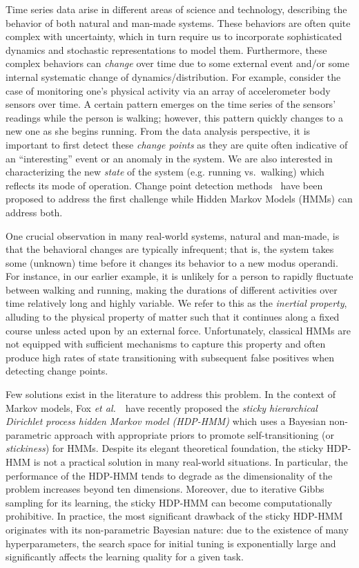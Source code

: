 \documentclass[letterpaper]{article}
\begin{document}
Time series data arise in different areas of science and technology, describing
the behavior of both natural and man-made systems. These
behaviors are often quite complex with uncertainty, which in turn require us to
incorporate sophisticated dynamics and stochastic representations to model them.
Furthermore, these complex behaviors can \emph{change} over time due to some external event and/or some internal
systematic change of dynamics/distribution. For example, consider the case of
monitoring one's physical activity via an array of accelerometer body sensors
over time. A certain pattern emerges on the time series of the sensors' readings
while the person is walking; however, this pattern quickly changes to a new one
as she begins running. From the data analysis perspective, it is
important to first detect these \emph{change points} as they are quite often
indicative of an ``interesting'' event or an anomaly in the system. We
are also interested in characterizing the new \emph{state} of the system (e.g. running vs.\
walking) which reflects its mode of operation. Change point detection
methods~\cite{kawahara2007change,xie2013change,liu2013change,ray2002bayesian}
have been proposed to address the first challenge while Hidden Markov Models (HMMs) can address both.

One crucial observation in many real-world systems, natural and man-made, is that the behavioral changes are typically infrequent; that is, the
system takes some (unknown) time before it changes its behavior to a new modus operandi. For
instance, in our earlier example, it is unlikely for a person to rapidly fluctuate between
walking and running, making the durations of different
activities over time relatively long and highly variable. We refer to this as the
\emph{inertial property}, alluding to the physical property of matter such that it continues
along a fixed course unless acted upon by an external
force. Unfortunately, classical HMMs are not equipped with sufficient
mechanisms to capture this property and often produce high rates of
state transitioning with subsequent false positives when detecting
change points.

Few solutions exist in the literature to address this problem. In
the context of Markov models, Fox \emph{et al.}~\cite{fox2011sticky,willsky2009nonparametric}\ have
recently proposed the \emph{sticky hierarchical Dirichlet process hidden Markov
model (HDP-HMM)} which uses a Bayesian non-parametric approach with appropriate
priors to promote self-transitioning (or \emph{stickiness}) for HMMs. Despite its
elegant theoretical foundation, the sticky HDP-HMM is not a practical solution in many real-world situations.
In particular, the performance of the HDP-HMM tends to degrade as the
dimensionality of the problem increases beyond ten dimensions. Moreover, due to 
iterative Gibbs sampling for its learning, the sticky HDP-HMM can become computationally prohibitive. 
In practice, the most significant drawback of the sticky HDP-HMM originates with its non-parametric 
Bayesian nature: due to the existence of many hyperparameters, the search space for initial tuning is 
exponentially large and significantly affects the learning quality for a given task.
\end{document}
